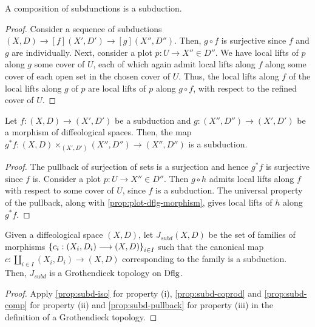 \documentclass[11pt]{amsart}
\begin{document}
\begin{prop}\label{prop:subd-comp}
A composition of subdunctions is a subduction.
\end{prop}
\begin{proof}
Consider a sequence of subductions $(X, D) \to[f] (X', D') \to[g] (X'', D'')$. Then,
$g \circ f$ is surjective since $f$ and $g$ are individually. Next, consider a plot
$p : U \to X'' \in D''$.
We have local lifts of $p$ along $g$ some cover of $U$, each of which again admit local lifts along
$f$ along some cover of each open set in the chosen cover of $U$.
Thus, the local lifts along $f$ of the local lifts along $g$ of $p$ are local lifts of $p$ along
$g \circ f$, with respect to the refined cover of $U$.
\end{proof}

\begin{prop}\label{prop:subd-pullback}
Let $f : (X, D) \to (X', D')$ be a subduction and $g : (X'', D'') \to (X', D')$
be a morphism of diffeological spaces. Then, the map
$g^*f : (X, D) \times_{(X', D')} (X'', D'') \to (X'', D'')$ is a subduction.
\end{prop}
\begin{proof}
The pullback of surjection of sets is a surjection and hence $g^*f$ is surjective
since $f$ is.
Consider a plot $p : U \to X'' \in D''$.
Then $g \circ h$ admits local lifts along $f$ with respect to some cover of $U$, since $f$ is a
subduction. The universal property of the pullback, along with \cref{prop:plot-dflg-morphism}, gives
local lifts of $h$ along $g^*f$.
\end{proof}

\begin{cor}
Given a diffeological space $(X, D)$, let $J_{subd}(X, D)$ be the set of families of morphisms
$\set{c_i : (X_i, D_i) \to (X, D)}_{i \in I}$  such that the canonical map
$c : \coprod_{i \in I} (X_i, D_i) \to (X, D)$ corresponding to the family is a subduction.
Then, $J_{subd}$ is a Grothendieck topology on $\mathrm{Dflg}$.
\end{cor}
\begin{proof}
Apply \cref{prop:subd-iso} for property (i), \cref{prop:subd-coprod} and \cref{prop:subd-comp}
for property (ii) and \cref{prop:subd-pullback} for property (iii) in the definition of a
Grothendieck topology.
\end{proof}
\end{document}
